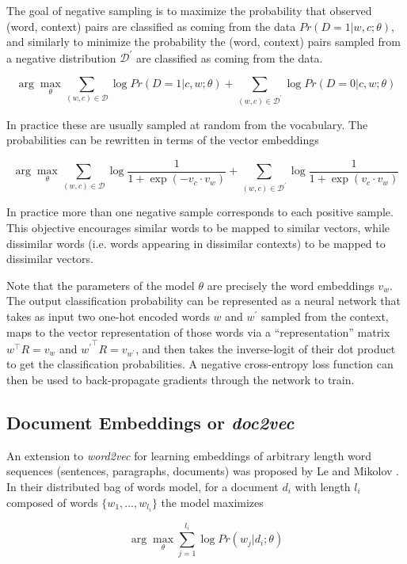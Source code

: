 The goal of negative sampling is to maximize the probability that observed (word, context) pairs are classified as coming from the data $Pr(D=1 | w, c ; \theta)$, and similarly to minimize the probability the (word, context) pairs sampled from a negative distribution $\mathcal{D^\prime}$ are classified as coming from the data.

$$
\arg\max_\theta \sum_{(w, c) \in \mathcal{D}} \log Pr(D = 1 | c, w ; \theta)
+ \sum_{(w, c) \in \mathcal{D^\prime}} \log Pr(D = 0 | c, w ; \theta)
$$

In practice these are usually sampled at random from the vocabulary. The probabilities can be rewritten in terms of the vector embeddings

$$
\arg\max_\theta
\sum_{(w, c) \in \mathcal{D}}
    \log \dfrac{1}{1 + \exp{(-v_c \cdot v_w)}}
+ \sum_{(w, c) \in \mathcal{D^\prime}}
    \log \dfrac{1}{1 + \exp{(v_c \cdot v_w)}}
$$

In practice more than one negative sample corresponds to each positive sample. This objective encourages similar words to be mapped to similar vectors, while dissimilar words (i.e. words appearing in dissimilar contexts) to be mapped to dissimilar vectors.

Note that the parameters of the model $\theta$ are precisely the word embeddings $v_w$. The output classification probability can be represented as a neural network that takes as input two one-hot encoded words $w$ and $w^\prime$ sampled from the context, maps to the vector representation of those words via a ``representation'' matrix $w^\top R = v_w$ and ${w^\prime}^\top R = v_{w^\prime}$, and then takes the inverse-logit of their dot product to get the classification probabilities. A negative cross-entropy loss function can then be used to back-propagate gradients through the network to train.

\subsection{Document Embeddings or \textit{doc2vec}}

An extension to \textit{word2vec} for learning embeddings of arbitrary length word sequences (sentences, paragraphs, documents) was proposed by Le and Mikolov \cite{Le2014}. In their distributed bag of words model, for a document $d_i$ with length $l_i$ composed of words $\{w_1, ..., w_{l_i}\}$ the model maximizes

$$
\arg\max_\theta \sum_{j=1}^{l_i} \log Pr(w_j | d_i ; \theta)
$$


